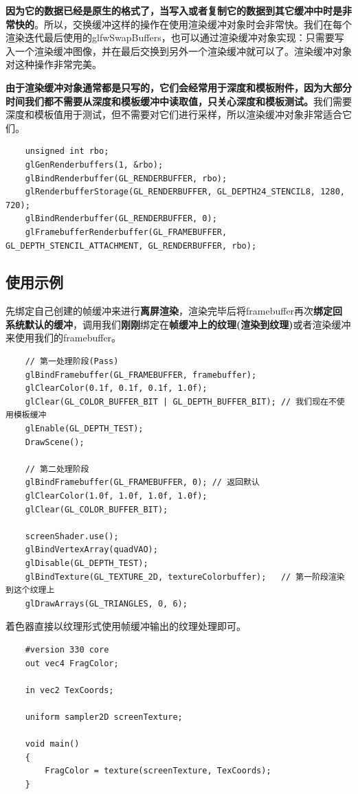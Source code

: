 \documentclass[UTF8,a4paper,12pt]{ctexbook}
\begin{document}
			\textbf{因为它的数据已经是原生的格式了，当写入或者复制它的数据到其它缓冲中时是非常快的}。所以，交换缓冲这样的操作在使用渲染缓冲对象时会非常快。我们在每个渲染迭代最后使用的glfwSwapBuffers，也可以通过渲染缓冲对象实现：只需要写入一个渲染缓冲图像，并在最后交换到另外一个渲染缓冲就可以了。渲染缓冲对象对这种操作非常完美。
			
			\textbf{由于渲染缓冲对象通常都是只写的，它们会经常用于深度和模板附件，因为大部分时间我们都不需要从深度和模板缓冲中读取值，只关心深度和模板测试。}我们需要深度和模板值用于测试，但不需要对它们进行采样，所以渲染缓冲对象非常适合它们。
			
			\begin{lstlisting}
	unsigned int rbo;
	glGenRenderbuffers(1, &rbo);
	glBindRenderbuffer(GL_RENDERBUFFER, rbo);
	glRenderbufferStorage(GL_RENDERBUFFER, GL_DEPTH24_STENCIL8, 1280, 720);
	glBindRenderbuffer(GL_RENDERBUFFER, 0);
	glFramebufferRenderbuffer(GL_FRAMEBUFFER, GL_DEPTH_STENCIL_ATTACHMENT, GL_RENDERBUFFER, rbo);			
			\end{lstlisting}
			
		\subsection{使用示例}
			先绑定自己创建的帧缓冲来进行\textbf{离屏渲染}，渲染完毕后将framebuffer再次\textbf{绑定回系统默认的缓冲}，调用我们\textbf{刚刚}绑定在\textbf{帧缓冲上的纹理(渲染到纹理)}或者渲染缓冲来使用我们的framebuffer。
		
			\begin{lstlisting}
	// 第一处理阶段(Pass)
	glBindFramebuffer(GL_FRAMEBUFFER, framebuffer);
	glClearColor(0.1f, 0.1f, 0.1f, 1.0f);
	glClear(GL_COLOR_BUFFER_BIT | GL_DEPTH_BUFFER_BIT); // 我们现在不使用模板缓冲
	glEnable(GL_DEPTH_TEST);
	DrawScene();    
	
	// 第二处理阶段
	glBindFramebuffer(GL_FRAMEBUFFER, 0); // 返回默认
	glClearColor(1.0f, 1.0f, 1.0f, 1.0f); 
	glClear(GL_COLOR_BUFFER_BIT);
	
	screenShader.use();  
	glBindVertexArray(quadVAO);
	glDisable(GL_DEPTH_TEST);
	glBindTexture(GL_TEXTURE_2D, textureColorbuffer);	// 第一阶段渲染到这个纹理上
	glDrawArrays(GL_TRIANGLES, 0, 6); 				
			\end{lstlisting}
	
			着色器直接以纹理形式使用帧缓冲输出的纹理处理即可。
			\begin{lstlisting}
	#version 330 core
	out vec4 FragColor;
	
	in vec2 TexCoords;
	
	uniform sampler2D screenTexture;
	
	void main()
	{ 
	    FragColor = texture(screenTexture, TexCoords);
	}			
			\end{lstlisting}
		
\end{document}
